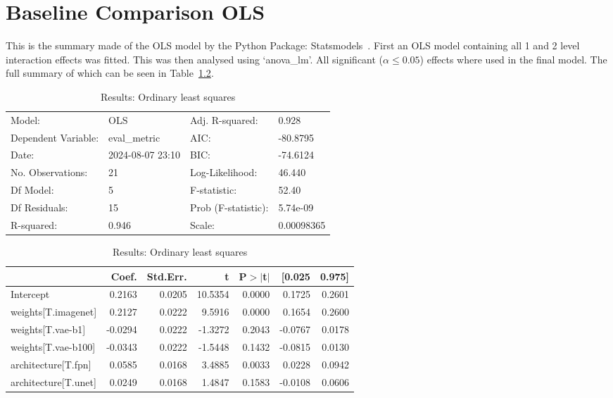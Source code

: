 \chapter{Baseline Comparison OLS}
\label{appendix:baselines_comparison_full}
This is the summary made of the OLS model by the Python Package: Statsmodels~\cite{josef_perktold_2024_10984387}. First an OLS model containing all 1 and 2 level interaction effects was fitted. This was then analysed using `anova\_lm'. All significant ($\alpha\le0.05$) effects where used in the final model. The full summary of which can be seen in Table~\ref{tab:comparison_baselines_full_ols}.

\begin{table}[ht]
\caption{Results: Ordinary least squares}
\label{tab:comparison_baselines_full_ols}
\begin{center}
\begin{tabular}{llll}
\hline
Model:              & OLS              & Adj. R-squared:     & 0.928       \\
Dependent Variable: & eval\_metric     & AIC:                & -80.8795    \\
Date:               & 2024-08-07 23:10 & BIC:                & -74.6124    \\
No. Observations:   & 21               & Log-Likelihood:     & 46.440      \\
Df Model:           & 5                & F-statistic:        & 52.40       \\
Df Residuals:       & 15               & Prob (F-statistic): & 5.74e-09    \\
R-squared:          & 0.946            & Scale:              & 0.00098365  \\
\hline
\end{tabular}
\end{center}

\begin{center}
\begin{tabular}{lrrrrrr}
\hline
                     &   Coef. & Std.Err. &       t & P$> |$t$|$ &  [0.025 & 0.975]  \\
\hline
Intercept            &  0.2163 &   0.0205 & 10.5354 &      0.0000 &  0.1725 & 0.2601  \\
weights[T.imagenet]  &  0.2127 &   0.0222 &  9.5916 &      0.0000 &  0.1654 & 0.2600  \\
weights[T.vae-b1]    & -0.0294 &   0.0222 & -1.3272 &      0.2043 & -0.0767 & 0.0178  \\
weights[T.vae-b100]  & -0.0343 &   0.0222 & -1.5448 &      0.1432 & -0.0815 & 0.0130  \\
architecture[T.fpn]  &  0.0585 &   0.0168 &  3.4885 &      0.0033 &  0.0228 & 0.0942  \\
architecture[T.unet] &  0.0249 &   0.0168 &  1.4847 &      0.1583 & -0.0108 & 0.0606  \\
\hline
\end{tabular}
\end{center}


\end{table}
